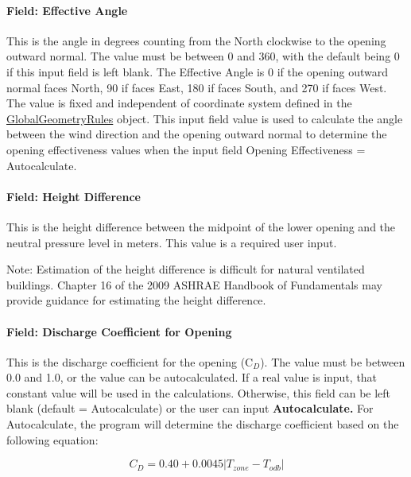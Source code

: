 \paragraph{Field: Effective Angle}\label{field-effective-angle}

This is the angle in degrees counting from the North clockwise to the opening outward normal. The value must be between 0 and 360, with the default being 0 if this input field is left blank. The Effective Angle is 0 if the opening outward normal faces North, 90 if faces East, 180 if faces South, and 270 if faces West. The value is fixed and independent of coordinate system defined in the \hyperref[globalgeometryrules]{GlobalGeometryRules} object. This input field value is used to calculate the angle between the wind direction and the opening outward normal to determine the opening effectiveness values when the input field Opening Effectiveness = Autocalculate.

\paragraph{Field: Height Difference}\label{field-height-difference}

This is the height difference between the midpoint of the lower opening and the neutral pressure level in meters. This value is a required user input.

Note: Estimation of the height difference is difficult for natural ventilated buildings. Chapter 16 of the 2009 ASHRAE Handbook of Fundamentals may provide guidance for estimating the height difference.

\paragraph{Field: Discharge Coefficient for Opening}\label{field-discharge-coefficient-for-opening}

This is the discharge coefficient for the opening (C\(_{D}\)). The value must be between 0.0 and 1.0, or the value can be autocalculated. If a real value is input, that constant value will be used in the calculations. Otherwise, this field can be left blank (default = Autocalculate) or the user can input \textbf{Autocalculate.} For Autocalculate, the program will determine the discharge coefficient based on the following equation:

\begin{equation}
{C_D} = 0.40 + 0.0045\left| {{T_{zone}} - {T_{odb}}} \right|
\end{equation}


